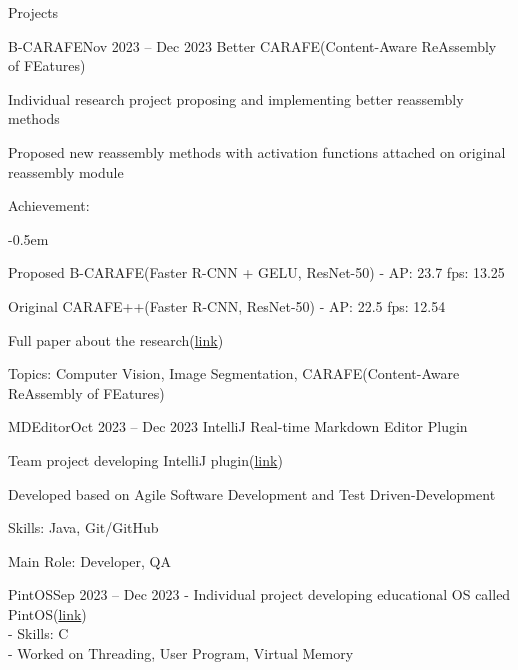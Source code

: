 \documentclass{resume}
\begin{document}
\begin{rSection}{Projects}
    \begin{rSubsection}{B-CARAFE}{Nov 2023 -- Dec 2023}
        Better CARAFE(Content-Aware ReAssembly of FEatures)

        \item Individual research project proposing and implementing better reassembly methods

        \item Proposed new reassembly methods with activation functions attached on original reassembly module

        \item Achievement:
        \vspace{-0.5em}
        \begin{list}{--}{\setlength{\rightmargin}{1.5em}}
            \itemsep -0.5em

            \item Proposed B-CARAFE(Faster R-CNN + GELU, ResNet-50) - AP: 23.7 fps: 13.25

            \item Original CARAFE++(Faster R-CNN, ResNet-50) - AP: 22.5 fps: 12.54
        \end{list}

        \item Full paper about the research(\href{https://github.com/minsusun/csed539/blob/main/main.pdf}{link})

        \item Topics: Computer Vision, Image Segmentation, CARAFE(Content-Aware ReAssembly of FEatures)
    \end{rSubsection}

    \begin{rSubsection}{MDEditor}{Oct 2023 -- Dec 2023}
        IntelliJ Real-time Markdown Editor Plugin

        \item Team project developing IntelliJ plugin(\href{https://github.com/minsusun/csed332-project}{link})

        \item Developed based on Agile Software Development and Test Driven-Development

        \item Skills: Java, Git/GitHub

        \item Main Role: Developer, QA
    \end{rSubsection}
    
    \begin{rSubsection}{PintOS}{Sep 2023 -- Dec 2023}
        - Individual project developing educational OS called PintOS(\href{https://github.com/minsusun/csed312-pintos}{link}) \\
        - Skills: C \\
        - Worked on Threading, User Program, Virtual Memory
    \end{rSubsection}
    

\end{rSection}
\end{document}
